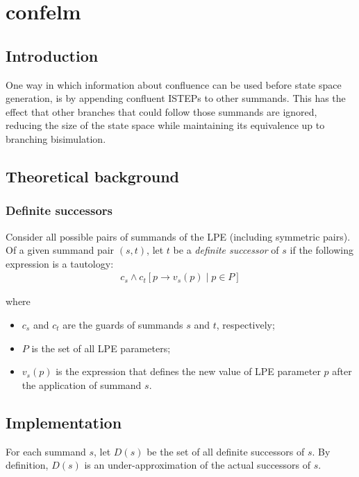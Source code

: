 \chapter{confelm}

\section{Introduction}
One way in which information about confluence can be used before state space generation, is by appending confluent ISTEPs to other summands.
This has the effect that other branches that could follow those summands are ignored, reducing the size of the state space while maintaining its equivalence up to branching bisimulation.

\section{Theoretical background}

\subsection{Definite successors}

Consider all possible pairs of summands of the LPE (including symmetric pairs).
Of a given summand pair $(s, t)$, let $t$ be a \emph{definite successor} of $s$ if the following expression is a tautology:
\begin{align*}
c_s \land {c_t}[p \rightarrow v_s(p) \;|\; p \in P]
\end{align*}

where

\begin{itemize}
\item $c_s$ and $c_t$ are the guards of summands $s$ and $t$, respectively;
\item $P$ is the set of all LPE parameters;
\item $v_s(p)$ is the expression that defines the new value of LPE parameter $p$ after the application of summand $s$.
\end{itemize}

\section{Implementation}

For each summand $s$, let $D(s)$ be the set of all definite successors of $s$.
By definition, $D(s)$ is an under-approximation of the actual successors of $s$.

